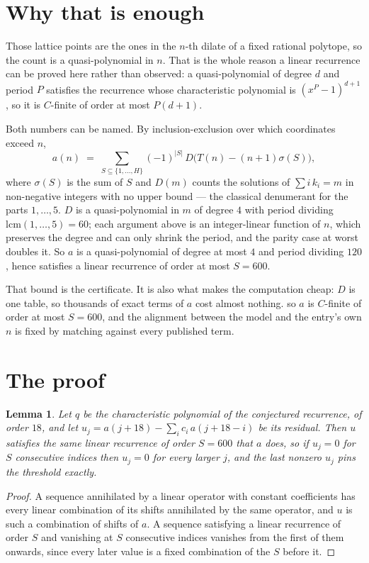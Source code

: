 \documentclass[11pt,a4paper]{article}
\theoremstyle{plain}
\newtheorem{lemma}[theorem]{Lemma}
\theoremstyle{definition}
\begin{document}
\section{Why that is enough}

Those lattice points are the ones in the $n$-th dilate of a fixed rational polytope, so the count is a quasi-polynomial in $n$. That is the whole reason a linear recurrence can be proved here rather than observed: a quasi-polynomial of degree $d$ and period $P$ satisfies the recurrence whose characteristic polynomial is $(x^{P}-1)^{d+1}$, so it is $C$-finite of order at most $P(d+1)$.

Both numbers can be named. By inclusion-exclusion over which coordinates exceed $n$,
\[ a(n)\;=\;\sum_{S\subseteq\{1,\dots,H\}}(-1)^{|S|}\,D\bigl(T(n)-(n+1)\sigma(S)\bigr), \]
where $\sigma(S)$ is the sum of $S$ and $D(m)$ counts the solutions of $\sum i\,k_i=m$ in non-negative integers with no upper bound --- the classical denumerant for the parts $1,\dots,5$. $D$ is a quasi-polynomial in $m$ of degree $4$ with period dividing $\mathrm{lcm}(1,\dots,5)=60$; each argument above is an integer-linear function of $n$, which preserves the degree and can only shrink the period, and the parity case at worst doubles it. So $a$ is a quasi-polynomial of degree at most $4$ and period dividing $120$, hence satisfies a linear recurrence of order at most $S=600$.

That bound is the certificate. It is also what makes the computation cheap: $D$ is one table, so thousands of exact terms of $a$ cost almost nothing.
so $a$ is $C$-finite of order at most $S=600$, and the alignment between the model and the
entry's own $n$ is fixed by matching against every published term.

\section{The proof}

\begin{lemma}\label{lem:crit}
Let $q$ be the characteristic polynomial of the conjectured recurrence, of order $18$,
and let $u_j=a(j+18)-\sum_i c_i\,a(j+18-i)$ be its residual. Then $u$ satisfies the
same linear recurrence of order $S=600$ that $a$ does, so if $u_j=0$ for $S$ consecutive
indices then $u_j=0$ for every larger $j$, and the last nonzero $u_j$ pins the threshold
exactly.
\end{lemma}

\begin{proof}
A sequence annihilated by a linear operator with constant coefficients has every linear
combination of its shifts annihilated by the same operator, and $u$ is such a combination of
shifts of $a$. A sequence satisfying a linear recurrence of order $S$ and vanishing at $S$
consecutive indices vanishes from the first of them onwards, since every later value is a
fixed combination of the $S$ before it.
\end{proof}
\end{document}
